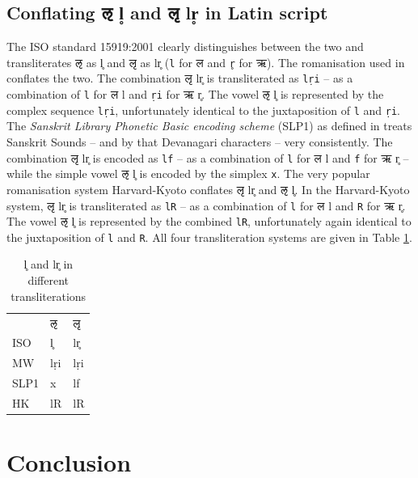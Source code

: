 \subsection{Conflating {\devhmfont ऌ} l̥ and {\devhmfont लृ} lr̥ in Latin script}

The ISO standard 15919:2001 clearly distinguishes between the two and  transliterates {\devfont ऌ} as l̥ and {\devfont लृ} as lr̥ (\texttt{l} for {\devfont ल} and \texttt{r̥} for {\devfont ऋ}). The romanisation used in \citet{mw72,mw} conflates the two. The combination {\devfont लृ} lr̥ is transliterated as \texttt{lṛi} – as a combination of \texttt{l} for {\devfont ल} l and \texttt{ṛi} for {\devfont ऋ} r̥. The vowel {\devfont ऌ} l̥ is represented by the complex sequence \texttt{lṛi}, unfortunately  identical to the juxtaposition of \texttt{l} and \texttt{ṛi}. The \emph{Sanskrit Library Phonetic Basic encoding scheme} (SLP1) as defined in \citet{ScharfHyman2011} treats Sanskrit Sounds – and by that Devanagari characters – very consistently. The combination {\devfont लृ} lr̥ is encoded as \texttt{lf} – as a combination of \texttt{l} for {\devfont ल} l and \texttt{f} for {\devfont ऋ} r̥ – while the simple vowel {\devfont ऌ} l̥ is encoded by the simplex \texttt{x}. The very popular romanisation system Harvard-Kyoto conflates {\devfont लृ} lr̥ and {\devfont ऌ} l̥. In the Harvard-Kyoto system, {\devfont लृ} lr̥  is transliterated as  \texttt{lR} – as a combination of \texttt{l} for {\devfont ल} l and \texttt{R} for {\devfont ऋ} r̥. The vowel {\devfont ऌ} l̥  is represented by the combined \texttt{lR}, unfortunately again identical to the juxtaposition of \texttt{l} and \texttt{R}. All four transliteration systems are given in Table \ref{tab:latin}. 

\begin{table}[!h]
\begin{center}
\begin{tabular}{lll}
&{\devfont ऌ}&{\devfont लृ}\\
ISO & l̥ & lr̥\\
MW & lṛi & lṛi\\
SLP1 & x & lf\\
HK & lR & lR\\
\end{tabular}
\end{center}
\caption[l̥ and lr̥ in different transliterations]{\label{tab:latin}l̥ and lr̥ in different transliterations}
\end{table}

\section{Conclusion}

